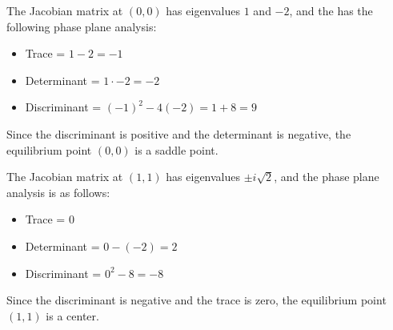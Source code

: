 \documentclass[10pt]{beamer}
\begin{document}
\begin{frame}
The Jacobian matrix at $(0, 0)$ has eigenvalues $1$ and $-2$, and the has the following phase plane analysis: 
\begin{itemize}
    \item Trace = $1 - 2 = -1$
    \item Determinant = $1 \cdot -2 = -2$
    \item Discriminant = $(-1)^2 - 4(-2) = 1 + 8 = 9$
\end{itemize}

Since the discriminant is positive and the determinant is negative, the equilibrium point $(0, 0)$ is a saddle point.
\end{frame}

\begin{frame}
The Jacobian matrix at $(1, 1)$ has eigenvalues $\pm i\sqrt{2}$, and the phase plane analysis is as follows:
\begin{itemize}
    \item Trace = $0$
    \item Determinant = $0 - (-2) = 2$
    \item Discriminant = $0^2 - 8 = -8$
\end{itemize}

Since the discriminant is negative and the trace is zero, the equilibrium point $(1, 1)$ is a center.

\end{frame}
\end{document}
